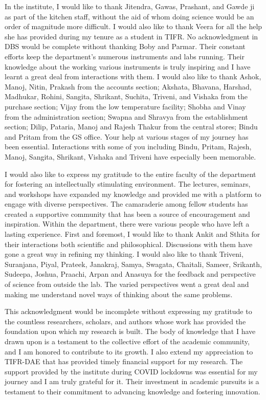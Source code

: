 In the institute, I would like to thank Jitendra, Gawas, Prashant, and Gawde ji as part of the kitchen staff, without the aid of whom doing science would be an order of magnitude more difficult. I would also like to thank Veera for all the help she has provided during my tenure as a student in TIFR. No acknowledgment in DBS would be complete without thanking Boby and Parmar. Their constant efforts keep the department's numerous instruments and labs running. Their knowledge about the working various instruments is truly inspiring and I have learnt a great deal from interactions with them. I would also like to thank Ashok, Manoj, Nitin, Prakash from the accounts section; Akshata, Bhavana, Harshad, Madhukar, Rohini, Sangita, Shrikant, Suchita, Triveni, and Vishaka from the purchase section; Vijay from the low temperature facility; Shobha and Vinay from the administration section; Swapna and Shravya from the establishment section; Dilip, Pataria, Manoj and Rajesh Thakur from the central stores; Bindu and Pritam from the GS office. Your help at various stages of my journey has been essential. Interactions with some of you including Bindu, Pritam, Rajesh, Manoj, Sangita, Shrikant, Vishaka and Triveni have especially been memorable.

I would also like to express my gratitude to the entire faculty of the department for fostering an intellectually stimulating environment. The lectures, seminars, and workshops have expanded my knowledge and provided me with a platform to engage with diverse perspectives. The camaraderie among fellow students has created a supportive community that has been a source of encouragement and inspiration. Within the department, there were various people who have left a lasting experience. First and foremost, I would like to thank Ankit and Sthita for their interactions both scientific and philosophical. Discussions with them have gone a great way in refining my thinking. I would also like to thank Triveni, Suranjana, Piyal, Prateek, Janakraj, Samya, Swagata, Chaitali, Sameer, Srikanth, Sudeepa, Joshua, Praachi, Arpan and Anasuya for the feedback and perspective of science from outside the lab. The varied perspectives went a great deal and making me understand novel ways of thinking about the same problems.

This acknowledgment would be incomplete without expressing my gratitude to the countless researchers, scholars, and authors whose work has provided the foundation upon which my research is built. The body of knowledge that I have drawn upon is a testament to the collective effort of the academic community, and I am honored to contribute to its growth. I also extend my appreciation to TIFR-DAE that has provided timely financial support for my research. The support provided by the institute during COVID lockdowns was essential for my journey and I am truly grateful for it. Their investment in academic pursuits is a testament to their commitment to advancing knowledge and fostering innovation.

